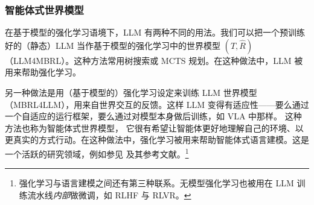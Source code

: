 \subsubsection{智能体式世界模型}
在基于模型的强化学习语境下，LLM 有两种不同的用法。我们可以把一个预训练好的（静态）LLM 当作基于模型的强化学习中的世界模型 $(\hat{T}, \hat{R})$（LLM4MBRL）。这种方法常用树搜索或 MCTS 规划。在这种做法中，LLM 被用来帮助强化学习。

另一种做法是用（基于模型的）强化学习设定来训练 LLM 世界模型（MBRL4LLM），用来自世界交互的反馈。这样 LLM 变得有适应性——要么通过一个自适应的运行框架，要么通过对模型本身做后训练，如 VLA 中那样。
这种方法也称为智能体式世界模型，
它很有希望让智能体更好地理解自己的环境、以更真实的方式行动。在这种做法中，强化学习被用来帮助智能体式语言建模。这是一个活跃的研究领域，例如参见
\citet{zuo2026qwen} 及其参考文献。\footnote{强化学习与语言建模之间还有第三种联系。无模型强化学习也被用在 LLM 训练流水线{\em 内部}做微调，如 RLHF 与 RLVR。}  %




